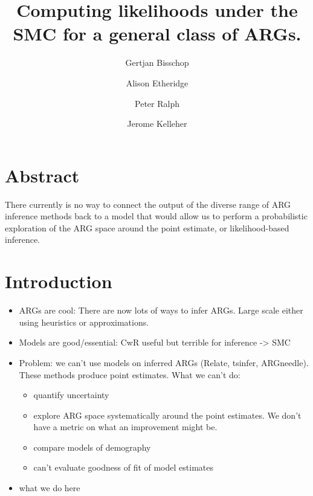 \documentclass{article}
\begin{document}
\linenumbers
\title{Computing likelihoods under the SMC for a general class of ARGs.}

\author[1, $\dagger$]{Gertjan Bisschop}

\author[2]{Alison Etheridge}
\author[3]{Peter Ralph}

\author[1]{Jerome Kelleher}

\maketitle


\section{Abstract}
There currently is no way to connect the output of the diverse
range of ARG inference methods back
to a model that would allow us to perform a probabilistic exploration of the
ARG space around the point estimate, or likelihood-based inference.

\section{Introduction}
\begin{itemize}
    \item ARGs are cool: There are now lots of ways to infer ARGs. Large scale either using heuristics or approximations.
    \item Models are good/essential: CwR useful but terrible for inference -> SMC
    \item Problem: we can't use models on inferred ARGs (Relate, tsinfer, ARGneedle). These methods produce point estimates. What we can't do:
        \begin{itemize}
            \item quantify uncertainty
            \item explore ARG space systematically around the point estimates. We don't have a metric on what an improvement might be.
            \item compare models of demography
            \item can't evaluate goodness of fit of model estimates
        \end{itemize}
    \item what we do here
\end{itemize}
\end{document}
